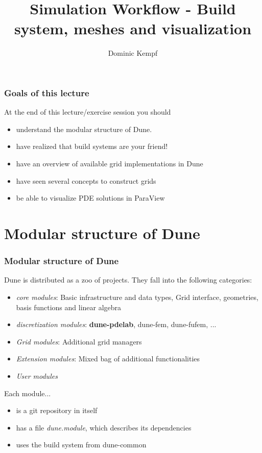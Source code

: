 \documentclass[aspectratio=169,11pt]{beamer}
\title{Simulation Workflow - Build system, meshes and visualization}
\author{Dominic Kempf}
\institute[]
{
  Scientific Software Center\\Heidelberg University\\
}
\theoremstyle{definition}
\begin{document}
\begin{frame}
\titlepage
\end{frame}

\begin{frame}
 \frametitle{Goals of this lecture}

 At the end of this lecture/exercise session you should
 \begin{itemize}
  \item understand the modular structure of Dune.
  \item have realized that build systems are your friend!
  \item have an overview of available grid implementations in Dune
  \item have seen several concepts to construct grids
  \item be able to visualize PDE solutions in ParaView
 \end{itemize}
\end{frame}


\section{Modular structure of Dune}

\begin{frame}[fragile]
 \frametitle{Modular structure of Dune}
 Dune is distributed as a zoo of projects.
 They fall into the following categories:

 \begin{itemize}
  \item \textit{core modules}: Basic infrastructure and data types,
  Grid interface, geometries, basis functions and linear algebra
  \item \textit{discretization modules}: \textbf{dune-pdelab},
  dune-fem, dune-fufem, ...
  \item \textit{Grid modules}: Additional grid managers
  \item \textit{Extension modules}: Mixed bag of additional functionalities
  \item \textit{User modules}
 \end{itemize}

 Each module...
 \begin{itemize}
  \item is a git repository in itself
  \item has a file \textit{dune.module}, which describes its dependencies
  \item uses the build system from dune-common
 \end{itemize}

\end{frame}
\end{document}

